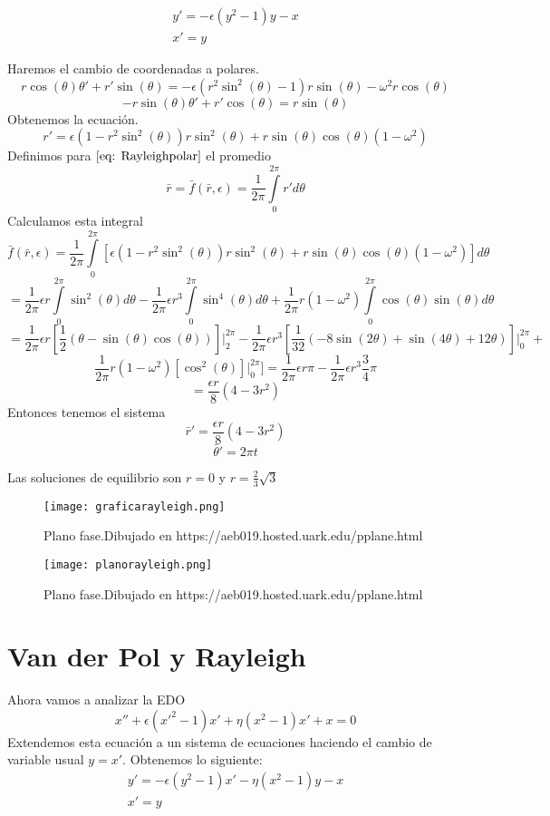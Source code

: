 \begin{equation}\label{eq: Rayleigh}
	\begin{matrix}
		y'=-\epsilon(y^2-1)y-x \\ 
		x'=y
	\end{matrix}
\end{equation}

Haremos el cambio de coordenadas a polares.
$$r\cos(\theta)\theta'+r'\sin(\theta)=-\epsilon (r^2\sin^2(\theta)-1)r\sin(\theta)-\omega^2r\cos(\theta) $$
$$-r\sin(\theta)\theta'+r'\cos(\theta)=r\sin(\theta)$$
Obtenemos la ecuación.
\begin{equation}\label{eq: Rayleighpolar}
	r'=\epsilon(1-r^2\sin^2(\theta))r\sin^2(\theta)+r\sin(\theta)\cos(\theta)(1-\omega^2)
\end{equation}
Definimos para $\eqref{eq: Rayleighpolar}$ el promedio
$$\bar{r}=\bar{f}(\bar{r},\epsilon)=\frac{1}{2\pi}\int\limits_0^{2\pi}r'd\theta$$
Calculamos esta integral
$$\bar{f}(\bar{r},\epsilon)=\frac{1}{2\pi}\int\limits_0^{2\pi}[\epsilon(1-r^2\sin^2(\theta))r\sin^2(\theta)+r\sin(\theta)\cos(\theta)(1-\omega^2)]d\theta$$
$$=\frac{1}{2\pi}\epsilon r\int\limits_0^{2\pi}\sin^2(\theta)d\theta-\frac{1}{2\pi}\epsilon r^3\int\limits_0^{2\pi}\sin^4(\theta)d\theta+\frac{1}{2\pi}r(1-\omega^2)\int\limits_0^{2\pi}\cos(\theta)\sin(\theta)d\theta$$
$$=\frac{1}{2\pi}\epsilon r[\frac{1}{2}(\theta-\sin(\theta)\cos(\theta))]\Big|_2^{2\pi}-\frac{1}{2\pi}\epsilon r^3[\frac{1}{32}(-8\sin(2\theta)+\sin(4\theta)+12\theta)]\Big|_0^{2\pi}+$$
$$\frac{1}{2\pi}r(1-\omega^2)[\cos^2(\theta)]\Big|_0^{2\pi}]=\frac{1}{2\pi}\epsilon r\pi-\frac{1}{2\pi}\epsilon r^3\frac{3}{4}\pi$$
$$=\frac{\epsilon r}{8}(4-3r^2)$$
Entonces tenemos el sistema
$$\bar{r}'=\frac{\epsilon r}{8}(4-3r^2)$$
$$\bar{\theta}'=2\pi t$$

Las soluciones de equilibrio son $r=0$ y $r=\frac{2}{3}\sqrt{3}$
\begin{figure}[h]
	\centering
	\texttt{[image: graficarayleigh.png]}
	\caption{Plano fase.Dibujado en https://aeb019.hosted.uark.edu/pplane.html}
\end{figure}
\begin{figure}[h]
	\centering
	\texttt{[image: planorayleigh.png]}
	\caption{Plano fase.Dibujado en https://aeb019.hosted.uark.edu/pplane.html}
\end{figure}

\newpage

\section{Van der Pol y Rayleigh}
Ahora vamos a analizar la EDO
\begin{equation}\label{eq: vdpr}
	x''+\epsilon(x'^2-1)x'+\eta(x^2-1)x'+x=0
\end{equation}
Extendemos esta ecuación a un sistema de ecuaciones haciendo el
cambio de variable usual $y=x'$. Obtenemos lo siguiente:
\begin{equation}\label{eq: vpdrsis}
	\begin{matrix}
		y'=-\epsilon(y^2-1)x'-\eta(x^2-1)y-x \\ 
		x'=y
	\end{matrix}
\end{equation}

